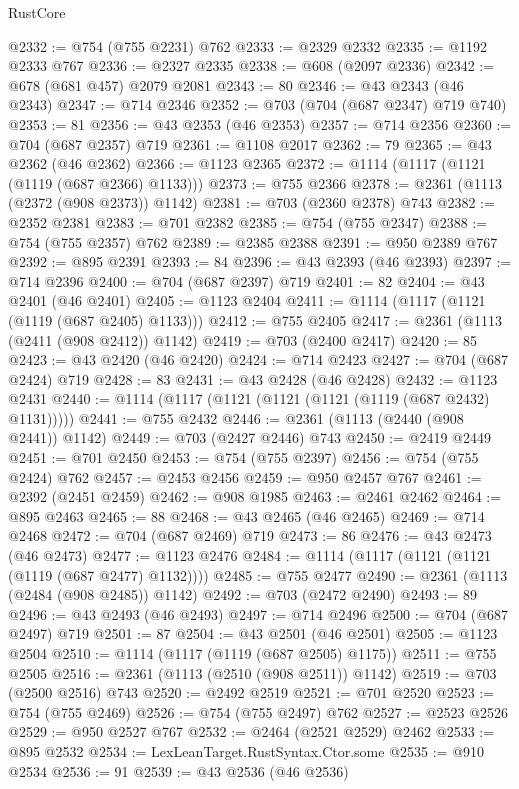 \begin{lexlean}{RustCore}
\begin{coremodule}
@2332 := @754 (@755 @2231) @762
@2333 := @2329 @2332
@2335 := @1192 @2333 @767
@2336 := @2327 @2335
@2338 := @608 (@2097 @2336)
@2342 := @678 (@681 @457) @2079 @2081
@2343 := 80
@2346 := @43 @2343 (@46 @2343)
@2347 := @714 @2346
@2352 := @703 (@704 (@687 @2347) @719 @740)
@2353 := 81
@2356 := @43 @2353 (@46 @2353)
@2357 := @714 @2356
@2360 := @704 (@687 @2357) @719
@2361 := @1108 @2017
@2362 := 79
@2365 := @43 @2362 (@46 @2362)
@2366 := @1123 @2365
@2372 := @1114 (@1117 (@1121 (@1119 (@687 @2366) @1133)))
@2373 := @755 @2366
@2378 := @2361 (@1113 (@2372 (@908 @2373)) @1142)
@2381 := @703 (@2360 @2378) @743
@2382 := @2352 @2381
@2383 := @701 @2382
@2385 := @754 (@755 @2347)
@2388 := @754 (@755 @2357) @762
@2389 := @2385 @2388
@2391 := @950 @2389 @767
@2392 := @895 @2391
@2393 := 84
@2396 := @43 @2393 (@46 @2393)
@2397 := @714 @2396
@2400 := @704 (@687 @2397) @719
@2401 := 82
@2404 := @43 @2401 (@46 @2401)
@2405 := @1123 @2404
@2411 := @1114 (@1117 (@1121 (@1119 (@687 @2405) @1133)))
@2412 := @755 @2405
@2417 := @2361 (@1113 (@2411 (@908 @2412)) @1142)
@2419 := @703 (@2400 @2417)
@2420 := 85
@2423 := @43 @2420 (@46 @2420)
@2424 := @714 @2423
@2427 := @704 (@687 @2424) @719
@2428 := 83
@2431 := @43 @2428 (@46 @2428)
@2432 := @1123 @2431
@2440 := @1114 (@1117 (@1121 (@1121 (@1121 (@1119 (@687 @2432) @1131)))))
@2441 := @755 @2432
@2446 := @2361 (@1113 (@2440 (@908 @2441)) @1142)
@2449 := @703 (@2427 @2446) @743
@2450 := @2419 @2449
@2451 := @701 @2450
@2453 := @754 (@755 @2397)
@2456 := @754 (@755 @2424) @762
@2457 := @2453 @2456
@2459 := @950 @2457 @767
@2461 := @2392 (@2451 @2459)
@2462 := @908 @1985
@2463 := @2461 @2462
@2464 := @895 @2463
@2465 := 88
@2468 := @43 @2465 (@46 @2465)
@2469 := @714 @2468
@2472 := @704 (@687 @2469) @719
@2473 := 86
@2476 := @43 @2473 (@46 @2473)
@2477 := @1123 @2476
@2484 := @1114 (@1117 (@1121 (@1121 (@1119 (@687 @2477) @1132))))
@2485 := @755 @2477
@2490 := @2361 (@1113 (@2484 (@908 @2485)) @1142)
@2492 := @703 (@2472 @2490)
@2493 := 89
@2496 := @43 @2493 (@46 @2493)
@2497 := @714 @2496
@2500 := @704 (@687 @2497) @719
@2501 := 87
@2504 := @43 @2501 (@46 @2501)
@2505 := @1123 @2504
@2510 := @1114 (@1117 (@1119 (@687 @2505) @1175))
@2511 := @755 @2505
@2516 := @2361 (@1113 (@2510 (@908 @2511)) @1142)
@2519 := @703 (@2500 @2516) @743
@2520 := @2492 @2519
@2521 := @701 @2520
@2523 := @754 (@755 @2469)
@2526 := @754 (@755 @2497) @762
@2527 := @2523 @2526
@2529 := @950 @2527 @767
@2532 := @2464 (@2521 @2529) @2462
@2533 := @895 @2532
@2534 := LexLeanTarget.RustSyntax.Ctor.some
@2535 := @910 @2534
@2536 := 91
@2539 := @43 @2536 (@46 @2536)

\end{coremodule}
\end{lexlean}
